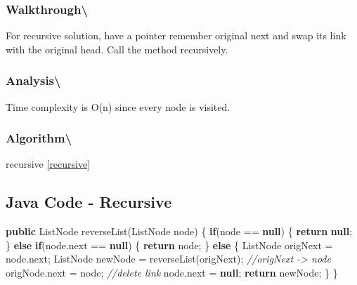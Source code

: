 \documentclass[]{book}
\newenvironment{Shaded}{\begin{snugshade}}{\end{snugshade}}
\newcommand{\CommentTok}[1]{\textcolor[rgb]{0.56,0.35,0.01}{\textit{#1}}}
\newcommand{\FunctionTok}[1]{\textcolor[rgb]{0.00,0.00,0.00}{#1}}
\newcommand{\KeywordTok}[1]{\textcolor[rgb]{0.13,0.29,0.53}{\textbf{#1}}}
\newcommand{\NormalTok}[1]{#1}
\begin{document}
\hypertarget{walkthrough-101}{%
\subsubsection{Walkthrough\textbackslash{}}\label{walkthrough-101}}

For recursive solution, have a pointer remember original next and swap its link with the original head. Call
the method recursively.

\hypertarget{analysis-108}{%
\subsubsection{Analysis\textbackslash{}}\label{analysis-108}}

Time complexity is O(n) since every node is visited.

\hypertarget{algorithm-114}{%
\subsubsection{Algorithm\textbackslash{}}\label{algorithm-114}}

recursive \ref{recursive}

\hypertarget{java-code---recursive-5}{%
\subsection{Java Code - Recursive}\label{java-code---recursive-5}}

\begin{Shaded}
\begin{Highlighting}[]
\KeywordTok{public}\NormalTok{ ListNode }\FunctionTok{reverseList}\NormalTok{(ListNode node) \{}
    \KeywordTok{if}\NormalTok{(node == }\KeywordTok{null}\NormalTok{) \{}
        \KeywordTok{return} \KeywordTok{null}\NormalTok{;}
\NormalTok{    \} }\KeywordTok{else} \KeywordTok{if}\NormalTok{(node.}\FunctionTok{next}\NormalTok{ == }\KeywordTok{null}\NormalTok{) \{}
        \KeywordTok{return}\NormalTok{ node;}
\NormalTok{    \} }\KeywordTok{else}\NormalTok{ \{}
\NormalTok{        ListNode origNext = node.}\FunctionTok{next}\NormalTok{;}
\NormalTok{        ListNode newNode = }\FunctionTok{reverseList}\NormalTok{(origNext);}
        \CommentTok{//origNext -> node}
\NormalTok{        origNode.}\FunctionTok{next}\NormalTok{ = node;}
        \CommentTok{//delete link}
\NormalTok{        node.}\FunctionTok{next}\NormalTok{ = }\KeywordTok{null}\NormalTok{;}
        \KeywordTok{return}\NormalTok{ newNode;}
\NormalTok{    \}}
\NormalTok{\}}
\end{Highlighting}
\end{Shaded}
\end{document}
